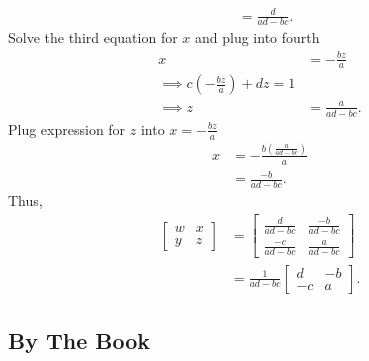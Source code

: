 \documentclass{report}
\begin{document}
\begin{itemize}
\begin{align*}
                &=\frac{d}{ad-bc}
            .\end{align*}
            Solve the third equation for $x$ and plug into fourth
            \begin{align*}
                x &=-\frac{bz}{a} \\
                \implies c\left(-\frac{bz}{a}\right) + dz = 1 \\
                \implies z&= \frac{a}{ad-bc}
            .\end{align*}
            Plug expression for $z$ into $x = -\frac{bz}{a} $
            \begin{align*}
                x &= - \frac{b\left(\frac{a}{ad-bc}\right)}{a} \\
                  &= \frac{-b}{ad-bc}
            .\end{align*}
            \bigbreak \noindent 
            Thus, 
            \begin{align*}
                \begin{bmatrix} w & x \\ y & z \end{bmatrix} &= \begin{bmatrix} \frac{d}{ad-bc} & \frac{-b}{ad-bc} \\ \frac{-c}{ad-bc} & \frac{a}{ad-bc}\end{bmatrix} \\
                                  &= \frac{1}{ad-bc} \begin{bmatrix}d & -b \\ -c & a \end{bmatrix}
            .\end{align*}



    \end{itemize}

    \pagebreak 
    \subsection{By The Book}
    \begin{itemize}
        
    \end{itemize}

    \pagebreak 
\end{document}
